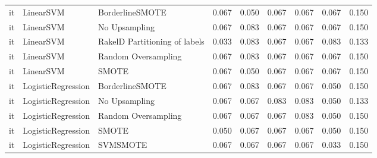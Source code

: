 \begin{tabular}{lllllllll}
      it &                       LinearSVM &               BorderlineSMOTE &     0.067 &                     0.050 &                 0.067 &                  0.067 &                                   0.067 &     0.150 \\
      it &                       LinearSVM &                 No Upsampling &     0.067 &                     0.083 &                 0.067 &                  0.067 &                                   0.067 &     0.150 \\
      it &                       LinearSVM & RakelD Partitioning of labels &     0.033 &                     0.083 &                 0.067 &                  0.067 &                                   0.083 &     0.133 \\
      it &                       LinearSVM &           Random Oversampling &     0.067 &                     0.083 &                 0.067 &                  0.067 &                                   0.067 &     0.150 \\
      it &                       LinearSVM &                         SMOTE &     0.067 &                     0.050 &                 0.067 &                  0.067 &                                   0.067 &     0.150 \\
      it &              LogisticRegression &               BorderlineSMOTE &     0.067 &                     0.083 &                 0.067 &                  0.067 &                                   0.050 &     0.150 \\
      it &              LogisticRegression &                 No Upsampling &     0.067 &                     0.067 &                 0.083 &                  0.083 &                                   0.050 &     0.133 \\
      it &              LogisticRegression &           Random Oversampling &     0.067 &                     0.067 &                 0.067 &                  0.083 &                                   0.050 &     0.150 \\
      it &              LogisticRegression &                         SMOTE &     0.050 &                     0.067 &                 0.067 &                  0.067 &                                   0.050 &     0.150 \\
      it &              LogisticRegression &                      SVMSMOTE &     0.067 &                     0.067 &                 0.067 &                  0.067 &                                   0.033 &     0.150 \\

\end{tabular}
